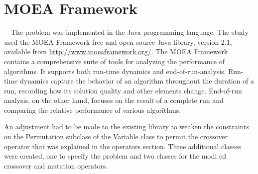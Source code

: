 \section[MOEA Framework]{\label{identificadorReferenciaCruzada}
MOEA Framework}

\ \ The problem was implemented in the Java programming language. The study used the MOEA Framework free and open source Java library, version 2.1, available from \underline{http://www.moeaframework.org/}. The MOEA Framework contains a comprehensive suite of tools for analyzing the performance of algorithms. It supports both run-time dynamics and end-of-run-analysis. Run-time dynamics capture the behavior of an algorithm throughout the duration of a run, recording how its solution quality and other elements change. End-of-run analysis, on the other hand, focuses on the result of a complete run and comparing the relative performance of various algorithms.

An adjustment had to be made to the existing library to weaken the constraints on the Permutation subclass of the Variable class to permit the crossover operator that was explained in the operators section. Three additional classes were created, one to specify the problem and two classes for the modi ed crossover and mutation operators.
